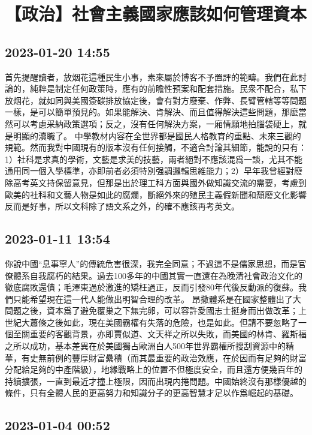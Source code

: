 \documentclass[twocolumn]{ctexart}
\begin{document}
\section*{【政治】社會主義國家應該如何管理資本}
\subsection*{2023-01-20 14:55}

首先提醒讀者，放烟花這種民生小事，素來屬於博客不予置評的範疇。我們在此討論的，純粹是制定任何政策時，應有的前瞻性預案和配套措施。民衆不配合，私下放烟花，就如同與美國簽碳排放協定後，會有對方廢棄、作弊、長臂管轄等等問題一樣，是可以簡單預見的。如果能解決、肯解決、而且值得解決這些問題，那麽當然可以考慮采納政策選項；反之，沒有任何解決方案，一廂情願地拍腦袋硬上，就是明顯的瀆職了。
中學教材内容在全世界都是國民人格教育的重點、未來三觀的規範。然而我對中國現有的版本沒有任何接觸，不適合討論其細節，能說的只有：1）社科是求真的學術，文藝是求美的技藝，兩者絕對不應該混爲一談，尤其不能通用同一個入學標準，亦即前者必須特別强調邏輯思維能力；2）早年我曾經對廢除高考英文持保留意見，但那是出於理工科方面與國外做知識交流的需要，考慮到歐美的社科和文藝人物是如此的腐爛，斷絕外來的殖民主義假新聞和頹廢文化影響反而是好事，所以文科除了語文系之外，的確不應該再考英文。
\subsection*{2023-01-11 13:54}

你說中國“息事寧人”的傳統危害很深，我完全同意；不過這不是儒家思想，而是官僚體系自我腐朽的結果。過去100多年的中國其實一直還在為晚清社會政治文化的徹底腐敗還債；毛澤東過於激進的矯枉過正，反而引發80年代後反動派的復蘇。我們只能希望現在這一代人能做出明智合理的改革。
昂撒體系是在國家整體出了大問題之後，資本爲了避免覆巢之下無完卵，可以容許愛國志士挺身而出做改革；上世紀大蕭條之後如此，現在美國霸權有失落的危險，也是如此。但請不要忽略了一個至關重要的客觀背景，亦即賈似道、文天祥之所以失敗，而美國的林肯、羅斯福之所以成功，基本差異在於美國獨占歐洲白人500年世界霸權所搜刮資源中的精華，有史無前例的豐厚財富纍積（而其最重要的政治效應，在於因而有足夠的財富分配給足夠的中產階級），地緣戰略上的位置不但極度安全，而且還方便幾百年的持續擴張，一直到最近才撞上極限，因而出現内捲問題。中國始終沒有那樣優越的條件，只有全體人民的更高努力和知識分子的更高智慧才足以作爲崛起的基礎。
\subsection*{2023-01-04 00:52}
\end{document}
